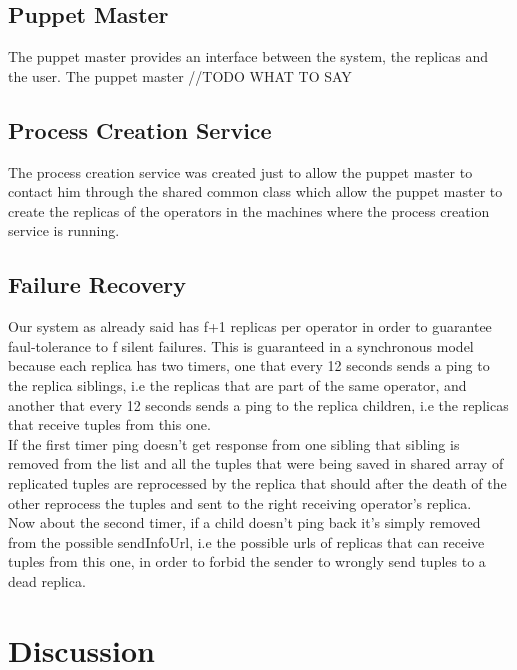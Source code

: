 \documentclass[times, 10pt, twocolumn]{article}
\begin{document}
\subsection{Puppet Master}
The puppet master provides an interface between the system, the replicas and the user.
The puppet master 
//TODO WHAT TO SAY




\subsection{Process Creation Service}
The process creation service was created just to allow the puppet master to contact him through the shared common class which allow the puppet master to create the replicas of the operators in the machines where the process creation service is running.



\subsection{Failure Recovery}
Our system as already said has f+1 replicas per operator in order to guarantee faul-tolerance to f silent failures. This is guaranteed in a synchronous model because each replica has two timers, one that every 12 seconds sends a ping to the replica siblings, i.e the replicas that are part of the same operator, and another that every 12 seconds sends a ping to the replica children, i.e the replicas that receive tuples from this one.
\\If the first timer ping doesn't get response from one sibling that sibling is removed from the list and all the tuples that were being saved in shared array of replicated tuples are reprocessed by the replica that should after the death of the other reprocess the tuples and sent to the right receiving operator's replica.
\\Now about the second timer, if a child doesn't ping back it's simply removed from the possible sendInfoUrl, i.e the possible urls of replicas that can receive tuples from this one, in order to forbid the sender to wrongly send tuples to a dead replica.





\section{Discussion}
\end{document}
